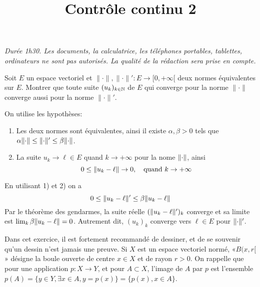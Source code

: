 \documentclass[a4paper]{tp_um}
\title{\large \sffamily\bfseries Contrôle continu 2}
\begin{document}
\maketitle
\textit{Durée 1h30. Les documents, la calculatrice, les téléphones portables, tablettes, ordinateurs ne sont pas autorisés. La qualité de la rédaction sera prise en compte.} 

\bigskip
\bigskip

 Soit $E$ un espace vectoriel et $\|\cdot\|, \|\cdot\|': E \to [0,+\infty[$  deux normes équivalentes sur $E$. Montrer que toute suite $(u_{k})_{k\in\mathbb{N}}$  de $E$ qui converge pour la norme $\|\cdot\|$ converge aussi pour la norme $\|\cdot\|'$.

\bigskip 
On utilise les hypothèses: 
	\begin{enumerate}
		\item 	Les deux normes sont équivalentes, ainsi il existe $\alpha, \beta >0$ tels que $ \alpha\lVert \cdot \rVert  \leq \lVert\cdot\rVert' \leq \beta \lVert\cdot\rVert$.

		\item 	La suite $u_k \to \ell \in E$ quand $k\to +\infty$ pour la nome $\lVert\cdot\rVert$, ainsi 
			\[
				0 \leq \lVert u_k - \ell\rVert \to 0, \quad \text{quand $k\to + \infty$}
			\]
	\end{enumerate}

En utilisant 1) et 2) on a 
\[
	0 \leq \lVert u_k - \ell\rVert' \leq \beta \lVert u_k - \ell\rVert
\]
Par le théorème des gendarmes, la suite réelle $(\lVert u_k - \ell\rVert')_k$  converge et sa limite est $\lim_k \beta \lVert u_k - \ell\rVert = 0$. Autrement dit, $(u_k)_k$ converge vers $\ell\in E$ pour $\lVert\cdot\rVert'$.

 Dans cet exercice, il est fortement recommand\'e de dessiner, et de se souvenir qu'un dessin n'est jamais une preuve.  Si $X$ est un espace vectoriel normé, «$B(x,r[$» désigne la boule ouverte de centre $x\in X$ et de rayon $r>0$. On rappelle que pour une application $p:X\rightarrow Y$, et pour $A\subset X$, l'image de $A$ par $p$ est l'ensemble $p(A)=\{ y\in  Y, \exists x\in A, y=p(x)\}=\{ p(x), x \in A\}$. 
\end{document}
